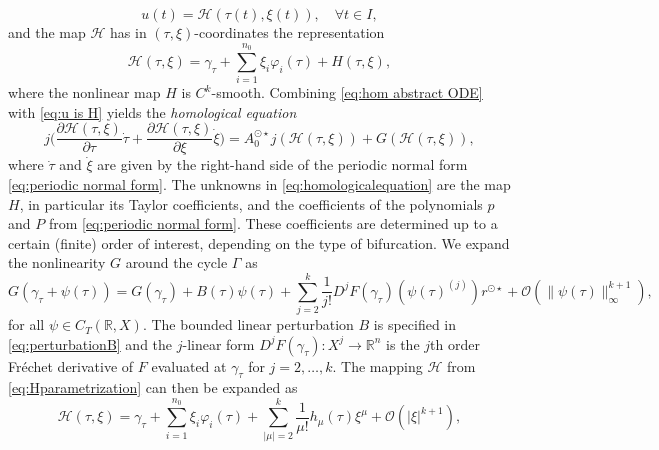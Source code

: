 \documentclass[english]{myarticle}
\begin{document}
\begin{sloppypar}
\begin{equation} \label{eq:u is H}
    u(t) = \mathcal{H}(\tau(t),\xi(t)), \quad \forall t \in I,
\end{equation}
and the map $\mathcal{H}$ has in $(\tau,\xi)$-coordinates the representation
\begin{equation} \label{eq:Hparametrization}
    \mathcal{H}(\tau,\xi) = \gamma_\tau + \sum_{i=1}^{n_0} \xi_i \varphi_i(\tau) + H(\tau,\xi),
\end{equation}
where the nonlinear map $H$ is $C^k$-smooth. Combining \eqref{eq:hom abstract ODE} with \eqref{eq:u is H} yields the \emph{homological equation}
\begin{equation} \label{eq:homologicalequation} \tag{HOM}
    j\bigg(\frac{\partial \mathcal{H}(\tau,\xi)}{\partial \tau} \dot{\tau} + \frac{\partial \mathcal{H}(\tau,\xi)}{\partial \xi} \dot{\xi} \bigg) = A_{0}^{\odot \star}j(\mathcal{H}(\tau,\xi)) + G(\mathcal{H}(\tau,\xi)),
\end{equation}
where $\dot{\tau}$ and $\dot{\xi}$ are given by the right-hand side of the periodic normal form \eqref{eq:periodic normal form}. The unknowns in \eqref{eq:homologicalequation} are the map $H$, in particular its Taylor coefficients, and the coefficients of the polynomials $p$ and $P$ from \eqref{eq:periodic normal form}. These coefficients are determined up to a certain (finite) order of interest, depending on the type of bifurcation. We expand the nonlinearity $G$ around the cycle $\Gamma$ as
\begin{equation} \label{eq:Gexpand}
    G(\gamma_\tau + \psi(\tau)) = G(\gamma_\tau) + B(\tau)\psi(\tau) + \sum_{j = 2}^{k} \frac{1}{j!}D^{j}F(\gamma_\tau)(\psi(\tau)^{(j)})r^{\odot \star} + \mathcal{O}(\|\psi(\tau)\|_{\infty}^{k+1}),
\end{equation}
for all $\psi \in C_T(\mathbb{R},X)$. The bounded linear perturbation $B$ is specified in \eqref{eq:perturbationB} and the $j$-linear form $D^jF(\gamma_\tau) : X^j \to \mathbb{R}^n$ is the $j$th order Fr\'echet derivative of $F$ evaluated at $\gamma_\tau$ for $j=2,\dots,k$. The mapping $\mathcal{H}$ from \eqref{eq:Hparametrization} can then be expanded as
\begin{equation} \label{eq:expandH}
    \mathcal{H}(\tau,\xi) = \gamma_\tau + \sum_{i=1}^{n_0} \xi_i \varphi_i(\tau) + \sum_{|\mu| = 2}^{k} \frac{1}{\mu!} h_\mu(\tau) \xi^\mu + \mathcal{O}(|\xi|^{k+1}),
\end{equation}

\end{sloppypar}
\end{document}
